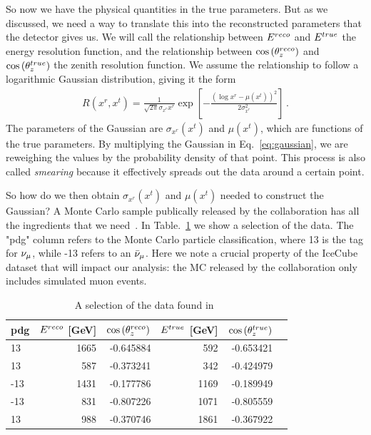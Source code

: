 So now we have the physical quantities in the true parameters. 
But as we discussed, we need a way to translate this into the reconstructed parameters that the detector gives us. We will call the relationship between 
$E^{reco}$ and $E^{true}$ the energy resolution function, and the relationship between $\cos{(\theta_z^{reco})}$ and $\cos{(\theta_z^{true})}$ the zenith resolution function. 
We assume the relationship to follow a logarithmic Gaussian distribution, giving it the form 
\begin{align}\label{eq:gaussian}
    R(x^r, x^t) = \frac{1}{\sqrt{2\pi} \sigma_{x^r}x^r} \exp\left[-\frac{(\log x^r-\mu(x^t))^2}{2\sigma_{x^r}^2}\right]\,.
\end{align}
The parameters of the Gaussian are $\sigma_{x^r}(x^t)$ and $\mu(x^t)$, which are functions of the true parameters. By multiplying the Gaussian in Eq.~\ref{eq:gaussian}, we are reweighing the values by the 
probability density of that point. This process is also called \emph{smearing} because it effectively spreads out the data around a certain point. 

So how do we then obtain $\sigma_{x^r}(x^t)$ and $\mu(x^t)$ needed to construct the Gaussian? A Monte Carlo sample publically released by the 
collaboration has all the ingredients that we need~\cite{IC2016}. In Table.~\ref{table:IC_MC} we show a selection of the data.
The "pdg" column refers to the Monte Carlo particle classification, where 13 is the tag for $\nu_\mu$, while -13 refers
to an $\bar{\nu}_\mu$. Here we note a crucial property of the IceCube dataset that will impact our analysis: the MC released by the collaboration
only includes simulated muon events.

\begin{table}[ht]
    \centering
    \begin{tabular}{lrrrrr}
        \hline \hline
        pdg &      $E^{reco}$ [\si{\GeV}] &     $\cos{(\theta_z^{reco})}$ &       $E^{true}$ [\si{\GeV}] &     $\cos{(\theta_z^{true})}$ \\
        \hline
         13 &  1665 & -0.645884 &    592 & -0.653421 \\
         13 &   587 & -0.373241 &    342 & -0.424979 \\
        -13 &  1431 & -0.177786 &   1169 & -0.189949 \\
        -13 &   831 & -0.807226 &   1071 & -0.805559 \\
         13 &   988 & -0.370746 &   1861 & -0.367922 \\
         \hline \hline
  \end{tabular}
  \caption{A selection of the data found in~\cite{IC2016}}
  \label{table:IC_MC}
\end{table}

